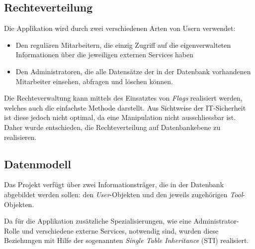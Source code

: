 \subsection{Rechteverteilung}
\label{sec:Rechteverteilung}
Die Applikation wird durch zwei verschiedenen Arten von Usern verwendet:
\begin{itemize}
	\item Den regulären Mitarbeitern, die einzig Zugriff auf die eigenverwalteten Informationen über die jeweiligen externen Services haben
	\item Den Administratoren, die alle Datensätze der in der Datenbank vorhandenen Mitarbeiter einsehen, abfragen und löschen können.
\end{itemize}
Die Rechteverwaltung kann mittels des Einsatztes von \textit{Flags} realisiert werden, welches auch die einfachste Methode darstellt. Aus Sichtweise der IT-Sicherheit ist diese jedoch nicht optimal, da eine Manipulation nicht ausschliessbar ist. Daher wurde entschieden, die Rechteverteilung auf
Datenbankebene zu realisieren.
%
%

\subsection{Datenmodell}
\label{sec:Datenmodell}
Das Projekt verfügt über zwei Informationsträger, die in der Datenbank abgebildet werden
sollen: den \textit{User}-Objekten und den jeweils zugehörigen \textit{Tool}-Objekten.


Da für die Applikation zusätzliche Spezialisierungen, wie eine Administrator-Rolle und verschiedene
externe Services, notwendig sind, wurden diese Beziehungen mit Hilfe der sogenannten
\textit{Single Table Inheritance} (\acs{STI}) realisiert.


